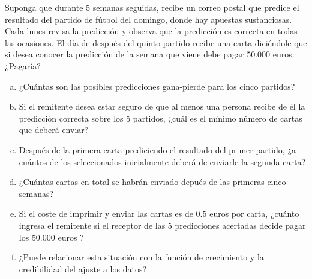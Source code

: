 \documentclass[12pt]{article}
\theoremstyle{definition}
\begin{document}
\begin{pregunta}
Suponga que durante 5 semanas seguidas, recibe un correo postal que predice el resultado del partido de fútbol del domingo, donde hay apuestas sustanciosas. Cada lunes revisa la predicción y observa que la predicción es correcta en todas las ocasiones. El día de después del quinto partido recibe una carta diciéndole que si desea conocer la predicción de la semana que viene debe pagar 50.000 euros. ¿Pagaría?
\begin{enumerate}[a)]
\item ¿Cuántas son las posibles predicciones gana-pierde para los cinco partidos?
\item Si el remitente desea estar seguro de que al menos una persona recibe de él la predicción correcta sobre los 5 partidos, ¿cuál es el mínimo número de cartas que deberá enviar?
\item Después de la primera carta prediciendo el resultado del primer partido, ¿a cuántos de los seleccionados inicialmente deberá de enviarle la segunda carta?
\item ¿Cuántas cartas en total se habrán enviado depués de las primeras cinco semanas?
\item  Si el coste de imprimir y enviar las cartas es de $0.5$ euros por carta, ¿cuánto ingresa el remitente si el receptor de las 5 predicciones acertadas decide pagar los $50.000$ euros ?
\item ¿Puede relacionar esta situación con la función de crecimiento y la credibilidad del ajuste a los datos?
\end{enumerate}


\end{pregunta}
\end{document}
